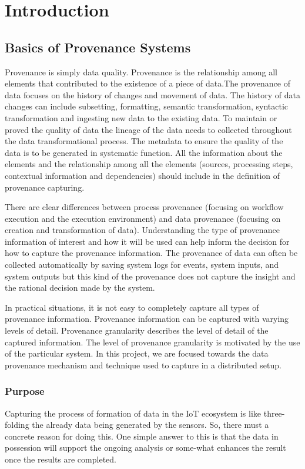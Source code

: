 \chapter{Introduction}

\section{Basics of Provenance Systems}
Provenance is simply data quality. Provenance is the relationship among all elements that contributed to the existence of a piece of data.The provenance of data focuses on the history of changes and movement of data. The history of data changes can include subsetting, formatting, semantic transformation, syntactic transformation and ingesting new data to the existing data. To maintain or proved the quality of data the lineage of the data needs to collected throughout the data transformational process. The metadata to ensure the quality of the data is to be generated in systematic function. All the information about the elements and the relationship among all the elements (sources, processing steps, contextual information and dependencies) should include in the definition of provenance capturing. 

There are clear differences between process provenance (focusing on workflow execution and the execution environment) and data provenance (focusing on creation and transformation of data). Understanding the type of provenance information of interest and how it will be used can help inform the decision for how to capture the provenance information. The provenance of data can often be collected automatically by saving system logs for events, system inputs, and system outputs but this kind of the provenance does not capture the insight and the rational decision made by the system. 

In practical situations, it is not easy to completely capture all types of provenance information. Provenance information can be captured with varying levels of detail.  Provenance granularity describes the level of detail of the captured information. The level of provenance granularity is motivated by the use of the particular system. In this project, we are focused towards the data provenance mechanism and technique used to capture in a distributed setup.

\subsection{Purpose}
Capturing the process of formation of data in the IoT ecosystem is like three-folding the already data being generated by the sensors. So, there must a concrete reason for doing this. One simple answer to this is that the data in possession will support the ongoing analysis or some-what enhances the result once the results are completed.

